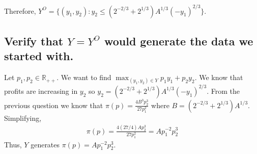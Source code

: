 \documentclass[11pt]{article} %
\begin{document}
Therefore, $Y^{O} = \{ (y_1,y_2) : y_2 \leq  ( 2^{-2/3} +  2^{1/3})A^{1/3}(-y_1)^{2/3}\}$.

\subsection{Verify that $Y = Y^{O}$ would generate the data we started with.}

Let $p_1,p_2 \in \mathbb{R}_{++}.$ We want to find $\max_{(y_1,y_2) \in Y} p_1y_1 + p_2y_2$. We know that profits are increasing in $y_2$ so $y_2 =  ( 2^{-2/3} +  2^{1/3})A^{1/3}(-y_1)^{2/3}$. From the previous question we know that $\pi(p) = \frac{4B^3p_{2}^{3}}{27p_{1}^{2}}$ where $B = ( 2^{-2/3} +  2^{1/3})A^{1/3}$. Simplifying, 
\begin{align*}
\pi(p) = \frac{4(27/4) A p_{2}^{3}}{27p_{1}^{2}} = Ap_{1}^{-2}p_{2}^{3}
\end{align*}
Thus, $Y$ generates $\pi(p) = Ap_{1}^{-2}p_{2}^{3}$.
\end{document}
